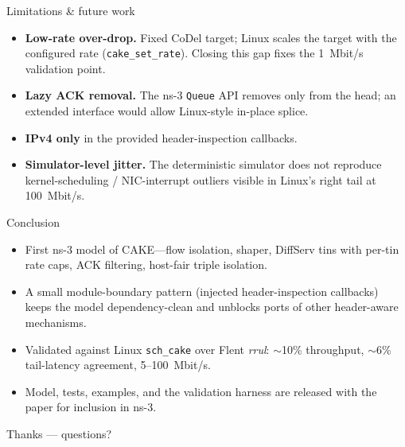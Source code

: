 \documentclass[10pt,aspectratio=169]{beamer}
\begin{document}
\begin{frame}{Limitations \& future work}
\begin{itemize}
  \item \textbf{Low-rate over-drop.} Fixed CoDel target; Linux scales the
        target with the configured rate (\texttt{cake\_set\_rate}). Closing
        this gap fixes the 1~Mbit/s validation point.
  \item \textbf{Lazy ACK removal.} The ns-3 \texttt{Queue} API removes only
        from the head; an extended interface would allow Linux-style
        in-place splice.
  \item \textbf{IPv4 only} in the provided header-inspection callbacks.
  \item \textbf{Simulator-level jitter.} The deterministic simulator does
        not reproduce kernel-scheduling / NIC-interrupt outliers visible in
        Linux's right tail at 100~Mbit/s.
\end{itemize}
\end{frame}

\begin{frame}{Conclusion}
\begin{itemize}
  \item First ns-3 model of CAKE---flow isolation, shaper, DiffServ tins
        with per-tin rate caps, ACK filtering, host-fair triple isolation.
  \item A small \alert{module-boundary pattern} (injected header-inspection
        callbacks) keeps the model dependency-clean and unblocks ports of
        other header-aware mechanisms.
  \item Validated against Linux \texttt{sch\_cake} over Flent \emph{rrul}:
        $\sim$10\% throughput, $\sim$6\% tail-latency agreement, 5--100~Mbit/s.
  \item Model, tests, examples, and the validation harness are released
        with the paper for inclusion in ns-3.
\end{itemize}
\begin{center}
\Large\alert{Thanks --- questions?}
\end{center}
\end{frame}
\end{document}
